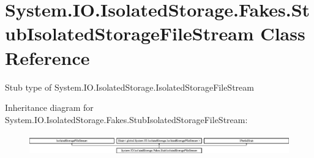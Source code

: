 \hypertarget{class_system_1_1_i_o_1_1_isolated_storage_1_1_fakes_1_1_stub_isolated_storage_file_stream}{\section{System.\-I\-O.\-Isolated\-Storage.\-Fakes.\-Stub\-Isolated\-Storage\-File\-Stream Class Reference}
\label{class_system_1_1_i_o_1_1_isolated_storage_1_1_fakes_1_1_stub_isolated_storage_file_stream}
}


Stub type of System.\-I\-O.\-Isolated\-Storage.\-Isolated\-Storage\-File\-Stream 


Inheritance diagram for System.\-I\-O.\-Isolated\-Storage.\-Fakes.\-Stub\-Isolated\-Storage\-File\-Stream\-:\begin{figure}[H]
\begin{center}
\leavevmode
\includegraphics[height=0.912795cm]{class_system_1_1_i_o_1_1_isolated_storage_1_1_fakes_1_1_stub_isolated_storage_file_stream}
\end{center}
\end{figure}
